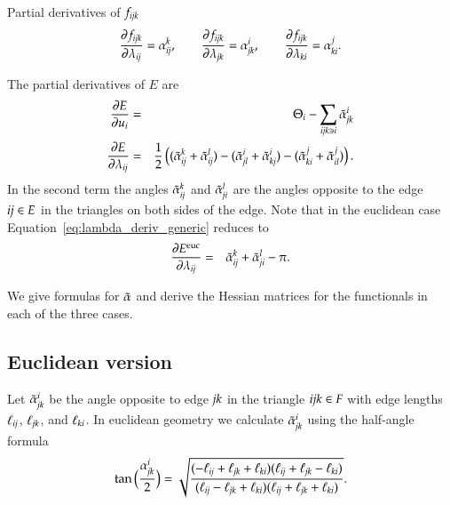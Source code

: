\documentclass[Thesis]{subfiles}
\begin{document}
\begin{proposition}{Partial derivatives of $f_{\it ijk}$}
\begin{equation}
\frac{\partial f_{\it ijk}}{\partial \lambda_{\it ij}}=\alpha^k_{\it ij},\quad\quad
\frac{\partial f_{\it ijk}}{\partial \lambda_{\it jk}}=\alpha^i_{\it jk},\quad\quad
\frac{\partial f_{\it ijk}}{\partial \lambda_{\it ki}}=\alpha^j_{\it ki}.
\end{equation}
\end{proposition}

The partial derivatives of $E$ are
\begin{eqnarray}
	\frac{\partial E}{\partial u_i} &=& \Theta_i - \sum_{\it ijk\ni i}\tilde{\alpha}_{\it jk}^i \\
	\frac{\partial E}{\partial \lambda_{\it ij}} &=& \frac{1}{2}\left((\tilde{\alpha}_{\it ij}^k + \tilde{\alpha}_{\it ij}^l) - (\tilde{\alpha}^i_{\it jl} + \tilde{\alpha}^i_{\it kj}) - (\tilde{\alpha}^j_{\it ki} + \tilde{\alpha}^j_{\it il})\right).\label{eq:lambda_deriv_generic}
\end{eqnarray}
In the second term the angles $\tilde{\alpha}_{\it ij}^k$ and $\tilde{\alpha}_{\it ji}^l$ are the angles opposite to the edge $\it ij\in E$ in the 
triangles on both sides of the edge. Note that in the euclidean case Equation~\ref{eq:lambda_deriv_generic} reduces to
\begin{eqnarray}
	\frac{\partial E^{\rm euc}}{\partial \lambda_{\it ij}} &=& \tilde{\alpha}_{\it ij}^k + \tilde{\alpha}_{\it ji}^l - \pi.\label{eq:lambda_deriv_euc}
\end{eqnarray}

We give formulas for $\tilde{\alpha}$ and derive the Hessian matrices for the functionals in each of the three cases.

\subsection{Euclidean version}
\label{sec:euclidean_fuctional}

Let $\tilde{\alpha}^i_{\it jk}$ be the angle opposite to edge $\it jk$ in the triangle $\it ijk\in F$ with edge lengths $\ell_{\it ij}$, $\ell_{\it jk}$, and $\ell_{\it ki}$. In euclidean geometry we calculate $\tilde{\alpha}^i_{\it jk}$ using the half-angle formula
\[\tan\Big(\frac{ \alpha_{\it jk}^i}{2}\Big) = \sqrt{\frac
{(-\ell_{\it ij} +\ell_{\it jk} +\ell_{\it ki})(\ell_{\it ij} +\ell_{\it jk} -\ell_{\it ki})}
{(\ell_{\it ij} -\ell_{\it jk} +\ell_{\it ki})(\ell_{\it ij} + \ell_{\it jk} +\ell_{\it ki})}}.\]
\end{document}
